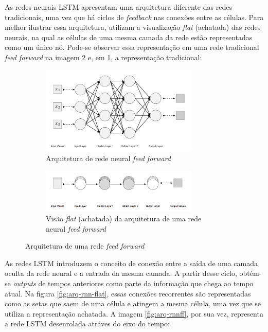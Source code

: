 As redes neurais LSTM apresentam uma arquitetura diferente 
das redes tradicionais, uma vez que há ciclos de \textit{feedback}
nas conexões entre as células. Para melhor ilustrar essa 
arquitetura, \cite{dl-oreilly} utilizam a visualização \textit{flat} 
 (achatada) das redes neurais, na qual as células de uma mesma 
camada da rede estão representadas como um único nó.
Pode-se observar essa representação em uma rede tradicional 
\textit{feed forward}
na imagem \ref{fig:arq-ff-flat} e, em
\ref{fig:arq-ff}, a representação 
tradicional:

\begin{figure}[H]
  \centering
  \begin{subfigure}{7.5cm}
      \centering
      \includegraphics[width=7.5cm]{../figuras/redes/arq-ff.png}
      \caption{Arquitetura de rede neural \textit{feed forward}}
      \label{fig:arq-ff}
  \end{subfigure}
  \hfill
  \begin{subfigure}{7.5cm}
      \centering
      \includegraphics[width=7.5cm]{../figuras/redes/arq-ff-flat.png}
      \caption{Visão \textit{flat} (achatada) da arquitetura de uma rede neural \textit{feed forward} }
      \label{fig:arq-ff-flat}
  \end{subfigure}
  \label{fig:comparacao-ff-flat-normal}
  \caption{Arquitetura de uma rede \textit{feed forward}}
\end{figure}

As redes LSTM introduzem o conceito de conexão entre a saída de uma 
camada oculta da rede neural e a entrada da mesma camada. A partir desse
ciclo, obtém-se \textit{outputs} de tempos anteriores como parte da informação que 
chega ao tempo atual. Na figura \ref{fig:arq-rnn-flat}, essas 
conexões recorrentes são representadas como as setas que saem de uma célula e 
atingem a mesma célula, uma vez que se utiliza a representação achatada.
A imagem \ref{fig:arq-rnnff}, por sua vez, representa a rede LSTM desenrolada 
atráves do eixo do tempo:

